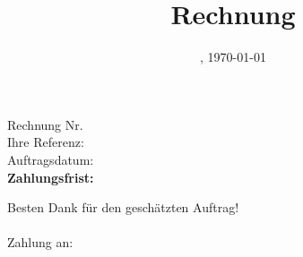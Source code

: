 \documentclass{chletter}
\author{}
\date{\location, \today}
\title{\textbf{Rechnung}}
\begin{document}
\begin{letter}{\custAdr}

\opening{Rechnung Nr. \quad \invNo \\ Ihre Referenz: \quad \comm \\ Auftragsdatum: \quad \dat \\ \bf{Zahlungsfrist: \quad \cond}}

  

\closing{Besten Dank für den geschätzten Auftrag! \\\\ Zahlung an:  \bank}

\end{letter}
\end{document}
